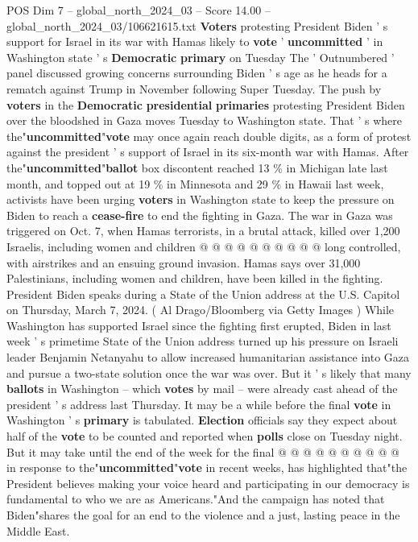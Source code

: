 \begin{textsample}{POS Dim 7 – global\_north\_2024\_03 – Score 14.00 – global\_north\_2024\_03/106621615.txt}  \label{ex:f7_pos_033}
\textbf{Voters} protesting President Biden ' s support for Israel in its war with Hamas likely to \textbf{vote} ' \textbf{uncommitted} ' in Washington state ' s \textbf{Democratic} \textbf{primary} on Tuesday The ' Outnumbered ' panel discussed growing concerns surrounding Biden ' s age as he heads for a rematch against Trump in November following Super Tuesday.
The push by \textbf{voters} in the \textbf{Democratic} \textbf{presidential} \textbf{primaries} protesting President Biden over the bloodshed in Gaza moves Tuesday to Washington state.
That ' s where the"\textbf{uncommitted}"\textbf{vote} may once again reach double digits, as a form of protest against the president ' s support of Israel in its six-month war with Hamas.
After the"\textbf{uncommitted}"\textbf{ballot} box discontent reached 13 \% in Michigan late last month, and topped out at 19 \% in Minnesota and 29 \% in Hawaii last week, activists have been urging \textbf{voters} in Washington state to keep the pressure on Biden to reach a \textbf{cease-fire} to end the fighting in Gaza.
The war in Gaza was triggered on Oct. 7, when Hamas terrorists, in a brutal attack, killed over 1,200 Israelis, including women and children @ @ @ @ @ @ @ @ @ @ long controlled, with airstrikes and an ensuing ground invasion.
Hamas says over 31,000 Palestinians, including women and children, have been killed in the fighting.
President Biden speaks during a State of the Union address at the U.S.
Capitol on Thursday, March 7, 2024. ( Al Drago/Bloomberg via Getty Images ) While Washington has supported Israel since the fighting first erupted, Biden in last week ' s primetime State of the Union address turned up his pressure on Israeli leader Benjamin Netanyahu to allow increased humanitarian assistance into Gaza and pursue a two-state solution once the war was over.
But it ' s likely that many \textbf{ballots} in Washington -- which \textbf{votes} by mail -- were already cast ahead of the president ' s address last Thursday.
It may be a while before the final \textbf{vote} in Washington ' s \textbf{primary} is tabulated. \textbf{Election} officials say they expect about half of the \textbf{vote} to be counted and reported when \textbf{polls} close on Tuesday night.
But it may take until the end of the week for the final @ @ @ @ @ @ @ @ @ @ in response to the"\textbf{uncommitted}"\textbf{vote} in recent weeks, has highlighted that"the President believes making your voice heard and participating in our democracy is fundamental to who we are as Americans."And the campaign has noted that Biden"shares the goal for an end to the violence and a just, lasting peace in the Middle East.

\end{textsample}

